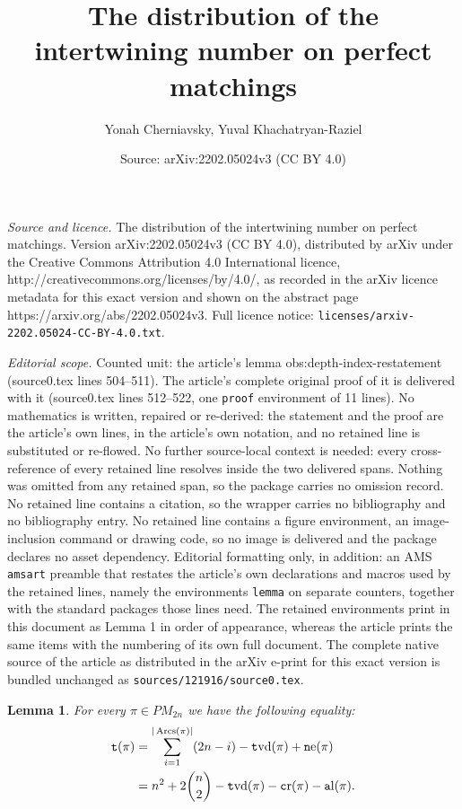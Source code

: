 \documentclass[10pt,a4paper]{amsart}
\title{The distribution of the intertwining number on perfect matchings}
\author{Yonah Cherniavsky, Yuval Khachatryan-Raziel}
\date{Source: arXiv:2202.05024v3 (CC BY 4.0)}
\newtheorem{lemma}{Lemma}
\DeclareMathOperator{\al}{\mathtt al}
\DeclareMathOperator{\arcs}{\text Arcs}
\DeclareMathOperator{\cro}{\mathtt cr}
\DeclareMathOperator{\dindex}{\mathtt t}
\DeclareMathOperator{\nst}{\mathtt ne}
\DeclareMathOperator{\tvd}{\mathtt tvd}
\begin{document}
\maketitle

\noindent\emph{Source and licence.} The distribution of the intertwining number on perfect matchings. Version arXiv:2202.05024v3 (CC BY 4.0), distributed by arXiv under the Creative Commons Attribution 4.0 International licence, http://creativecommons.org/licenses/by/4.0/, as recorded in the arXiv licence metadata for this exact version and shown on the abstract page https://arxiv.org/abs/2202.05024v3. Full licence notice: \texttt{licenses/arxiv-2202.05024-CC-BY-4.0.txt}.\par\smallskip

\noindent\textit{Editorial scope.} Counted unit: the article's lemma obs:depth-index-restatement (source0.tex lines 504--511). The article's complete original proof of it is delivered with it (source0.tex lines 512--522, one \texttt{proof} environment of 11 lines). No mathematics is written, repaired or re-derived: the statement and the proof are the article's own lines, in the article's own notation, and no retained line is substituted or re-flowed.  No further source-local context is needed: every cross-reference of every retained line resolves inside the two delivered spans.  Nothing was omitted from any retained span, so the package carries no omission record.  No retained line contains a citation, so the wrapper carries no bibliography and no bibliography entry.  No retained line contains a figure environment, an image-inclusion command or drawing code, so no image is delivered and the package declares no asset dependency.  Editorial formatting only, in addition: an AMS \texttt{amsart} preamble that restates the article's own declarations and macros used by the retained lines, namely the environments \texttt{lemma} on separate counters, together with the standard packages those lines need.  The retained environments print in this document as Lemma 1 in order of appearance, whereas the article prints the same items with the numbering of its own full document.  The complete native source of the article as distributed in the arXiv e-print for this exact version is bundled unchanged as \texttt{sources/121916/source0.tex}.
\begin{lemma}\label{obs:depth-index-restatement}
	For every $\pi\in PM_{2n}$ we have the following equality:
	\begin{align*}
	\dindex(\pi) 
		&= \sum_{i=1}^{|\arcs(\pi)|}(2n-i) - \tvd(\pi) + \nst(\pi) \\
		&= n^2 + 2\binom{n}{2} - \tvd(\pi) - \cro(\pi) - \al(\pi).		  
	\end{align*}
\end{lemma}
\end{document}
